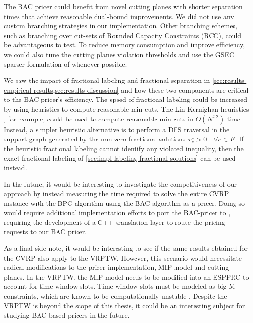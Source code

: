 The BAC pricer could benefit from novel cutting planes with shorter separation times that achieve reasonable dual-bound improvements.
We did not use any custom branching strategies in our implementation.
Other branching schemes, such as branching over cut-sets of Rounded Capacity Constraints (RCC), could be advantageous to test.
To reduce memory consumption and improve efficiency, we could also tune the cutting planes violation thresholds and use the GSEC sparser formulation of  whenever possible.


We saw the impact of fractional labeling and fractional separation in \cref{sec:results-empirical-results,sec:results-discussion} and how these two components are critical to the BAC pricer's efficiency.
The speed of fractional labeling could be increased by using heuristics to compute reasonable min-cuts.
The Lin-Kernighan heuristics \parencite{kernighan1970}, for example, could be used to compute reasonable min-cuts in $O(N^{2.2})$ time.
Instead, a simpler heuristic alternative is to perform a DFS traversal in the support graph generated by the non-zero fractional solutions $x^\star_e > 0 \quad \forall e \in E$.
If the heuristic fractional labeling cannot identify any violated inequality, then the exact fractional labeling of \cref{sec:impl-labeling-fractional-solutions} can be used instead.


\medskip

In the future, it would be interesting to investigate the competitiveness of our approach by instead measuring the time required to solve the entire CVRP instance with the BPC algorithm using the BAC algorithm as a pricer.
Doing so would require additional implementation efforts to port the BAC-pricer to \bapcod{}, requiring the development of a C++ translation layer to route the \bapcod{} pricing requests to our BAC pricer.

As a final side-note, it would be interesting to see if the same results obtained for the CVRP also apply to the VRPTW.
However, this scenario would necessitate radical modifications to the pricer implementation, MIP model and cutting planes.
In the VRPTW, the MIP model needs to be modified into an ESPPRC to account for time window slots.
Time window slots must be modeled as big-M constraints, which are known to be computationally unstable \parencite{jepsen2008branchandcut}.
Despite the VRPTW is beyond the scope of this thesis, it could be an interesting subject for studying BAC-based pricers in the future.
